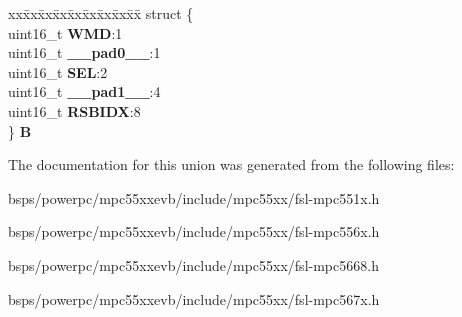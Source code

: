 \begin{DoxyCompactItemize}
\begin{tabbing}
\end{tabbing}\item 
\mbox{\label{unionuRSBIR_a7057c8e5c2cbdc58e1850a5fa531cd4e}} 
\begin{tabbing}
xx\=xx\=xx\=xx\=xx\=xx\=xx\=xx\=xx\=\kill
struct \{\\
\>uint16\_t {\bfseries WMD}:1\\
\>uint16\_t {\bfseries \_\_pad0\_\_}:1\\
\>uint16\_t {\bfseries SEL}:2\\
\>uint16\_t {\bfseries \_\_pad1\_\_}:4\\
\>uint16\_t {\bfseries RSBIDX}:8\\
\} {\bfseries B}\\

\end{tabbing}\end{DoxyCompactItemize}


The documentation for this union was generated from the following files\+:\begin{DoxyCompactItemize}
\item 
bsps/powerpc/mpc55xxevb/include/mpc55xx/fsl-\/mpc551x.\+h\item 
bsps/powerpc/mpc55xxevb/include/mpc55xx/fsl-\/mpc556x.\+h\item 
bsps/powerpc/mpc55xxevb/include/mpc55xx/fsl-\/mpc5668.\+h\item 
bsps/powerpc/mpc55xxevb/include/mpc55xx/fsl-\/mpc567x.\+h\end{DoxyCompactItemize}
